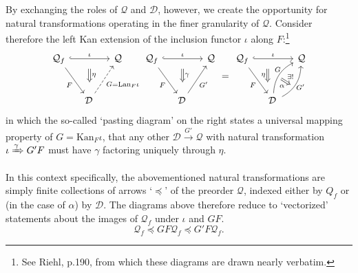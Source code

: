 \documentclass{article}
\newcommand{\D}{\ensuremath{\mathcal{D}}}
\newcommand{\Q}{\ensuremath{\mathcal{Q}}}
\begin{document}
By exchanging the roles of $\Q$ and $\D$, however, we create the opportunity for natural transformations operating in the finer granularity of $\Q$.  Consider therefore the left Kan extension of the inclusion functor $\iota$ along $F$:\footnote{See Riehl, p.190, from which these diagrams are drawn nearly verbatim.}
\begin{equation}\label{Kan-yup}
  \begin{tikzcd}[row sep=large,column sep=small]
    \Q_f \ar[dr,"F"'] \ar[rr,hook,"\iota",""{name=U,below}] & & \Q \\
    & \D\, \ar[ur,dashed,"G=\text{Lan}_F \iota"']
      \ar[Rightarrow,shorten <=2mm,shorten >=4mm,from=U,"\eta"{pos=0.4}]
  \end{tikzcd}
  \begin{tikzcd}[row sep=large,column sep=small]
    \Q_f \ar[dr,"F"'] \ar[rr,hook,"\iota",""{name=U,below}] & & \Q \\
    & \D\, \ar[ur,"G'"']
      \ar[Rightarrow,shorten <=2mm,shorten >=4mm,from=U,"\gamma"{pos=0.4}]
  \end{tikzcd}
  =
  \begin{tikzcd}[row sep=large,column sep=small]
    \Q_f \ar[dr,"F"'] \ar[rr,hook,"\iota",""{name=U,below}] & & \Q \\
    & \D\, \ar[ur,bend left,"G"{pos=0.6,inner sep=0.2},""{name=H,below}]
           \ar[ur,bend right,"G'"'{inner sep=0},""{pos=0.35,name=I,above}]
           \ar[Rightarrow,from=H,to=I,"\exists !"{pos=0.4},"\alpha"'{pos=0.6}]
    \ar[Rightarrow,shorten <=2mm,shorten >=4mm,from=U,shift right=2mm,"\eta"'{pos=0.4}]
  \end{tikzcd}
\end{equation}
in which the so-called `pasting diagram' on the right states a universal mapping property of $G = \text{Kan}_F\iota$, that any other $\D \xrightarrow{G'} \Q$ with natural transformation $\iota \xRightarrow{\gamma} G'F$ must have $\gamma$ factoring uniquely through $\eta$.

In this context specifically, the abovementioned natural transformations are simply finite collections of arrows `$\preceq$' of the preorder $\Q$, indexed either by $Q_f$ or (in the case of $\alpha$) by $\D$.  The diagrams above therefore reduce to `vectorized' statements about the images of $\Q_f$ under $\iota$ and $G F$.
\begin{equation}\label{Kan-vectorized}
  \Q_f \preceq G F \Q_f \preceq G' F \Q_f.
\end{equation}
\end{document}
